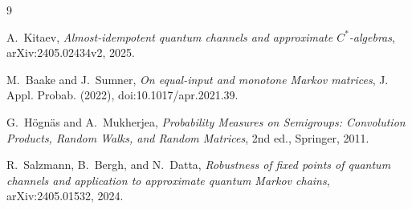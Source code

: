 \documentclass[10pt]{article}
\begin{document}
\begin{thebibliography}{9}

A.~Kitaev,
\emph{Almost-idempotent quantum channels and approximate $C^*$-algebras},
arXiv:2405.02434v2, 2025.

M.~Baake and J.~Sumner,
\emph{On equal-input and monotone Markov matrices},
J. Appl. Probab. (2022), doi:10.1017/apr.2021.39.

G.~H\"ogn\"as and A.~Mukherjea,
\emph{Probability Measures on Semigroups: Convolution Products, Random
Walks, and Random Matrices}, 2nd ed., Springer, 2011.

R.~Salzmann, B.~Bergh, and N.~Datta,
\emph{Robustness of fixed points of quantum channels and application to
approximate quantum Markov chains}, arXiv:2405.01532, 2024.

\end{thebibliography}
\end{document}
